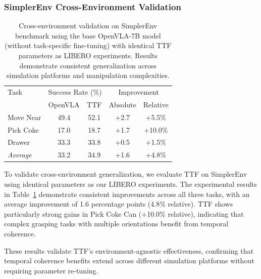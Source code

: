\documentclass[letterpaper]{article}
\begin{document}
\subsubsection{SimplerEnv Cross-Environment Validation}

\begin{table}[h]
\centering
\small
\begin{tabular}{l|cc|cc}
\hline
Task & \multicolumn{2}{c|}{Success Rate (\%)} & \multicolumn{2}{c}{Improvement} \\
& OpenVLA & TTF & Absolute & Relative \\
\hline
Move Near & 49.4 & 52.1 & +2.7 & +5.5\% \\
Pick Coke & 17.0 & 18.7 & +1.7 & +10.0\% \\
Drawer & 33.3 & 33.8 & +0.5 & +1.5\% \\
\hline
\textit{Average} & 33.2 & 34.9 & +1.6 & +4.8\% \\
\hline
\end{tabular}
\caption{Cross-environment validation on SimplerEnv benchmark using the base OpenVLA-7B model (without task-specific fine-tuning) with identical TTF parameters as LIBERO experiments. Results demonstrate consistent generalization across simulation platforms and manipulation complexities.}
\label{tab:simplerenv_results}
\end{table}

To validate cross-environment generalization, we evaluate TTF on SimplerEnv using identical parameters as our LIBERO experiments. The experimental results in Table~\ref{tab:simplerenv_results} demonstrate consistent improvements across all three tasks, with an average improvement of 1.6 percentage points (4.8\% relative). TTF shows particularly strong gains in Pick Coke Can (+10.0\% relative), indicating that complex grasping tasks with multiple orientations benefit from temporal coherence.

These results validate TTF's environment-agnostic effectiveness, confirming that temporal coherence benefits extend across different simulation platforms without requiring parameter re-tuning.
\end{document}
